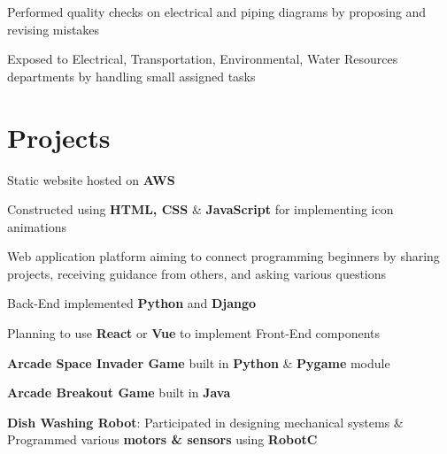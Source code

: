 \documentclass[]{morris-cv}
\begin{document}
\begin{minipage}[t]{0.67\textwidth}
\begin{tightemize}
    \item Performed quality checks on electrical and piping diagrams by proposing and revising mistakes
    \item Exposed to Electrical, Transportation, Environmental, Water Resources departments by handling small assigned tasks
\end{tightemize}
\sectionsep


\section{Projects}
\descript{}
\location{}
\begin{tightemize}
    \item Static website hosted on \textbf{AWS}
    \item Constructed using \textbf{HTML, CSS} \& \textbf{JavaScript} for implementing icon animations
\end{tightemize}
\sectionsep

\descript{}
\location{}
\begin{tightemize}
    \item Web application platform aiming to connect programming beginners by sharing projects, receiving guidance from others, and asking various questions
    \item Back-End implemented \textbf{Python} and \textbf{Django}
    \item Planning to use \textbf{React} or \textbf{Vue} to implement Front-End components
\end{tightemize}
\sectionsep

\descript{}
\location{}
\begin{tightemize}
    \item \textbf{Arcade Space Invader Game} built in \textbf{Python} \& \textbf{Pygame} module
    \item \textbf{Arcade Breakout Game} built in \textbf{Java}
    \item \textbf {Dish Washing Robot}: Participated in designing mechanical systems \& Programmed various  \textbf{motors \& sensors} using \textbf{RobotC}
\end{tightemize}
\sectionsep


\end{minipage}
\end{document}
